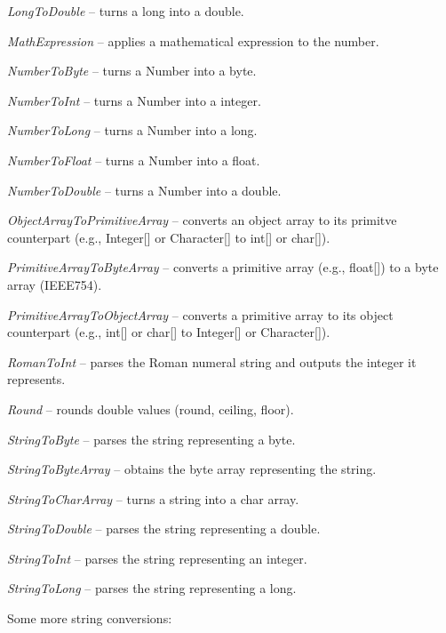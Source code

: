 \begin{tight_itemize}
	\item \textit{LongToDouble} -- turns a long into a double.
	\item \textit{MathExpression} -- applies a mathematical expression to the number.
	\item \textit{NumberToByte} -- turns a Number into a byte.
	\item \textit{NumberToInt} -- turns a Number into a integer.
	\item \textit{NumberToLong} -- turns a Number into a long.
	\item \textit{NumberToFloat} -- turns a Number into a float.
	\item \textit{NumberToDouble} -- turns a Number into a double.
	\item \textit{ObjectArrayToPrimitiveArray} -- converts an object array to
	its primitve counterpart (e.g., Integer[] or Character[] to int[] or char[]).
	\item \textit{PrimitiveArrayToByteArray} -- converts a primitive array (e.g., float[]) to a byte array (IEEE754).
	\item \textit{PrimitiveArrayToObjectArray} -- converts a primitive array to
	its object counterpart (e.g., int[] or char[] to Integer[] or Character[]).
	\item \textit{RomanToInt} -- parses the Roman numeral string and outputs the integer it represents.
	\item \textit{Round} -- rounds double values (round, ceiling, floor).
	\item \textit{StringToByte} -- parses the string representing a byte.
	\item \textit{StringToByteArray} -- obtains the byte array representing the string.
  \item \textit{StringToCharArray} -- turns a string into a char array.
	\item \textit{StringToDouble} -- parses the string representing a double.
	\item \textit{StringToInt} -- parses the string representing an integer.
	\item \textit{StringToLong} -- parses the string representing a long.
\end{tight_itemize}
Some more string conversions:
